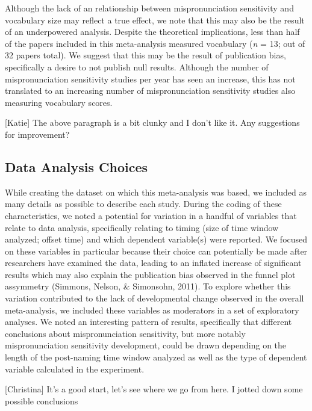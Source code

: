 \documentclass[man]{apa6}
\theoremstyle{definition}
\theoremstyle{definition}
\theoremstyle{definition}
\theoremstyle{remark}
\begin{document}
Although the lack of an relationship between mispronunciation
sensitivity and vocabulary size may reflect a true effect, we note that
this may also be the result of an underpowered analysis. Despite the
theoretical implications, less than half of the papers included in this
meta-analysis measured vocabulary (\emph{n} = 13; out of 32 papers
total). We suggest that this may be the result of publication bias,
specifically a desire to not publish null results. Although the number
of mispronunciation sensitivity studies per year has seen an increase,
this has not translated to an increasing number of mispronunciation
sensitivity studies also measuring vocabulary scores.

{[}Katie{]} The above paragraph is a bit clunky and I don't like it. Any
suggestions for improvement?

\subsection{Data Analysis Choices}\label{data-analysis-choices}

While creating the dataset on which this meta-analysis was based, we
included as many details as possible to describe each study. During the
coding of these characteristics, we noted a potential for variation in a
handful of variables that relate to data analysis, specifically relating
to timing (size of time window analyzed; offset time) and which
dependent variable(s) were reported. We focused on these variables in
particular because their choice can potentially be made after
researchers have examined the data, leading to an inflated increase of
significant results which may also explain the publication bias observed
in the funnel plot assymmetry (Simmons, Nelson, \& Simonsohn, 2011). To
explore whether this variation contributed to the lack of developmental
change observed in the overall meta-analysis, we included these
variables as moderators in a set of exploratory analyses. We noted an
interesting pattern of results, specifically that different conclusions
about mispronunciation sensitivity, but more notably mispronunciation
sensitivity development, could be drawn depending on the length of the
post-naming time window analyzed as well as the type of dependent
variable calculated in the experiment.

{[}Christina{]} It's a good start, let's see where we go from here. I
jotted down some possible conclusions
\end{document}
